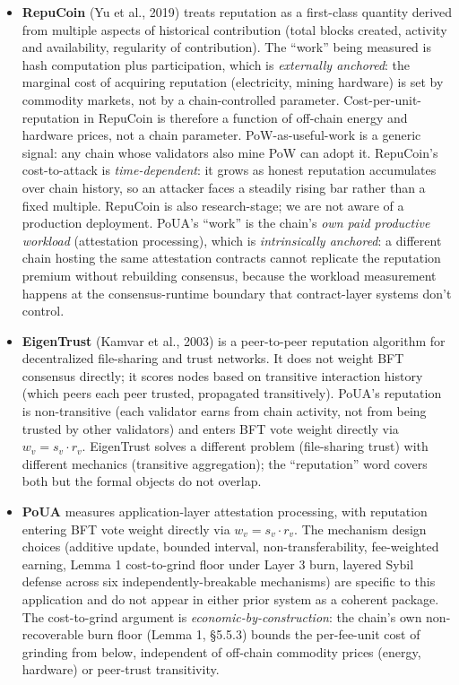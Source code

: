 \documentclass[
  11pt,
]{article}
\providecommand{\tightlist}{%
  \setlength{\itemsep}{0pt}\setlength{\parskip}{0pt}}
\begin{document}
\begin{itemize}
\tightlist
\item
  \textbf{RepuCoin} (Yu et al., 2019) treats reputation as a first-class
  quantity derived from multiple aspects of historical contribution
  (total blocks created, activity and availability, regularity of
  contribution). The ``work'' being measured is hash computation plus
  participation, which is \emph{externally anchored}: the marginal cost
  of acquiring reputation (electricity, mining hardware) is set by
  commodity markets, not by a chain-controlled parameter.
  Cost-per-unit-reputation in RepuCoin is therefore a function of
  off-chain energy and hardware prices, not a chain parameter.
  PoW-as-useful-work is a generic signal: any chain whose validators
  also mine PoW can adopt it. RepuCoin's cost-to-attack is
  \emph{time-dependent}: it grows as honest reputation accumulates over
  chain history, so an attacker faces a steadily rising bar rather than
  a fixed multiple. RepuCoin is also research-stage; we are not aware of
  a production deployment. PoUA's ``work'' is the chain's \emph{own paid
  productive workload} (attestation processing), which is
  \emph{intrinsically anchored}: a different chain hosting the same
  attestation contracts cannot replicate the reputation premium without
  rebuilding consensus, because the workload measurement happens at the
  consensus-runtime boundary that contract-layer systems don't control.
\item
  \textbf{EigenTrust} (Kamvar et al., 2003) is a peer-to-peer reputation
  algorithm for decentralized file-sharing and trust networks. It does
  not weight BFT consensus directly; it scores nodes based on transitive
  interaction history (which peers each peer trusted, propagated
  transitively). PoUA's reputation is non-transitive (each validator
  earns from chain activity, not from being trusted by other validators)
  and enters BFT vote weight directly via \(w_v = s_v \cdot r_v\).
  EigenTrust solves a different problem (file-sharing trust) with
  different mechanics (transitive aggregation); the ``reputation'' word
  covers both but the formal objects do not overlap.
\item
  \textbf{PoUA} measures application-layer attestation processing, with
  reputation entering BFT vote weight directly via
  \(w_v = s_v \cdot r_v\). The mechanism design choices (additive
  update, bounded interval, non-transferability, fee-weighted earning,
  Lemma 1 cost-to-grind floor under Layer 3 burn, layered Sybil defense
  across six independently-breakable mechanisms) are specific to this
  application and do not appear in either prior system as a coherent
  package. The cost-to-grind argument is
  \emph{economic-by-construction}: the chain's own non-recoverable burn
  floor (Lemma 1, §5.5.3) bounds the per-fee-unit cost of grinding from
  below, independent of off-chain commodity prices (energy, hardware) or
  peer-trust transitivity.
\end{itemize}
\end{document}
